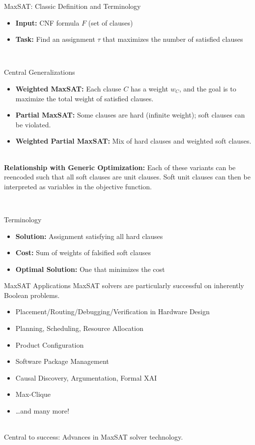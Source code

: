 \documentclass[t,english]{sdqbeamer}
\begin{document}
\begin{frame}{MaxSAT: Classic Definition and Terminology}
\vspace{-2em}
\begin{itemize}
	\item \textbf{Input:} CNF formula $F$ (set of clauses)
	\item \textbf{Task:} Find an assignment $\tau$ that maximizes the number of satisfied clauses
\end{itemize}~\\
\begin{block}{Central Generalizations}
\begin{itemize}
	\item \textbf{Weighted MaxSAT:} Each clause $C$ has a weight $w_C$, and the goal is to maximize the total weight of satisfied clauses.
	\item \textbf{Partial MaxSAT:} Some clauses are hard (infinite weight); soft clauses can be violated.
	\item \textbf{Weighted Partial MaxSAT:} Mix of hard clauses and weighted soft clauses.
\end{itemize}~\\
\textbf{Relationship with Generic Optimization:} Each of these variants can be reencoded such that all soft clauses are unit clauses. Soft unit clauses can then be interpreted as variables in the objective function.
\end{block}~\\
\begin{block}{Terminology}
\begin{itemize}
	\item \textbf{Solution:} Assignment satisfying all hard clauses
	\item \textbf{Cost:} Sum of weights of falsified soft clauses
	\item \textbf{Optimal Solution:} One that minimizes the cost
\end{itemize}
\end{block}
\end{frame}

\begin{frame}{MaxSAT Applications}
MaxSAT solvers are particularly successful on inherently Boolean problems.\\[1em]
\begin{itemize}\itemsep1em
	\item Placement/Routing/Debugging/Verification in Hardware Design
	\item Planning, Scheduling, Resource Allocation
	\item Product Configuration
	\item Software Package Management
	\item Causal Discovery, Argumentation, Formal XAI
  	\item Max-Clique
  	\item \dots and many more!
\end{itemize}~\\[1ex]
Central to success: Advances in MaxSAT solver technology.
\end{frame}
\end{document}
